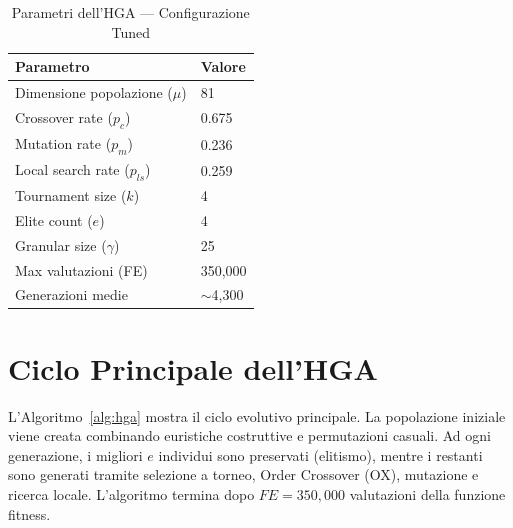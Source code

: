 \begin{table}[H]
\centering
\caption{Parametri dell'HGA --- Configurazione Tuned}
\label{tab:params}
\begin{tabular}{@{}ll@{}}
\toprule
\textbf{Parametro} & \textbf{Valore} \\
\midrule
Dimensione popolazione ($\mu$) & 81 \\
Crossover rate ($p_c$) & 0.675 \\
Mutation rate ($p_m$) & 0.236 \\
Local search rate ($p_{ls}$) & 0.259 \\
Tournament size ($k$) & 4 \\
Elite count ($e$) & 4 \\
Granular size ($\gamma$) & 25 \\
Max valutazioni (FE) & 350{,}000 \\
Generazioni medie & $\sim$4{,}300 \\
\bottomrule
\end{tabular}
\end{table}

\section{Ciclo Principale dell'HGA}

L'Algoritmo~\ref{alg:hga} mostra il ciclo evolutivo principale. La popolazione
iniziale viene creata combinando euristiche costruttive e permutazioni casuali.
Ad ogni generazione, i migliori $e$ individui sono preservati (elitismo), mentre
i restanti sono generati tramite selezione a torneo, Order Crossover (OX), mutazione
e ricerca locale. L'algoritmo termina dopo $FE = 350{,}000$ valutazioni della
funzione fitness.

